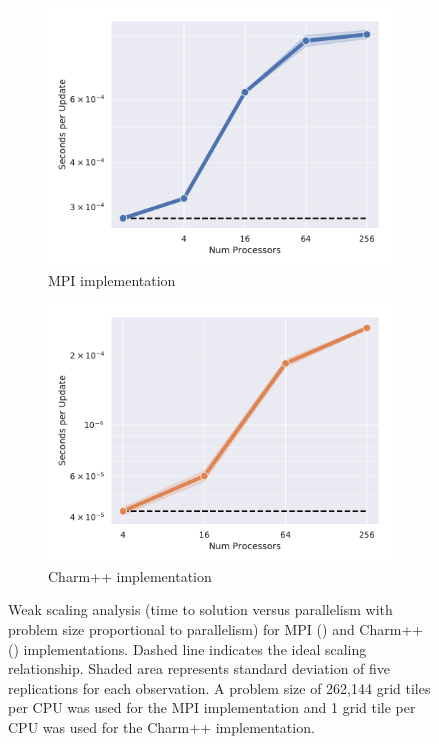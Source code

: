 
\begin{figure}
\begin{subfigure}[b]{0.5\textwidth}
\includegraphics[width=\textwidth]{img/MPIWeak}
\caption{
MPI implementation
}
\label{fig:mpi_weak}
\end{subfigure}
\begin{subfigure}[b]{0.5\textwidth}
  \includegraphics[width=\textwidth]{img/CharmWeak}
\caption{
Charm++ implementation
}
\label{fig:charm_weak}
\end{subfigure}
\caption{
Weak scaling analysis (time to solution versus parallelism with problem size proportional to parallelism) for MPI () and Charm++ () implementations.
Dashed line indicates the ideal scaling relationship.
Shaded area represents standard deviation of five replications for each observation.
A problem size of 262,144 grid tiles per CPU was used for the MPI implementation and 1 grid tile per CPU was used for the Charm++ implementation.
}
\label{fig:weak}
\end{figure}
